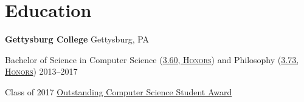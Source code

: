 \documentclass[]{article}
\newcommand\VRule{\color{lightgray}\vrule width 0.5pt}
\begin{document}


\section*{Education}

\textbf{Gettysburg College} \hfill Gettysburg, PA

 Bachelor of Science in Computer Science {\footnotesize \textsc{(\href{https://www.gettysburg.edu/academic-programs/computer-science/programs/honors-programs}{3.60, Honors})}} and Philosophy {\footnotesize \textsc{(\href{https://web.archive.org/web/20170310055408/https://www.gettysburg.edu/academics/philosophy/awards/}{3.73, Honors})}} \hfill {\footnotesize 2013--2017}

Class of 2017 \href{https://www.gettysburg.edu/academic-programs/computer-science/programs/honors-programs}{Outstanding Computer Science Student Award}

\end{document}
